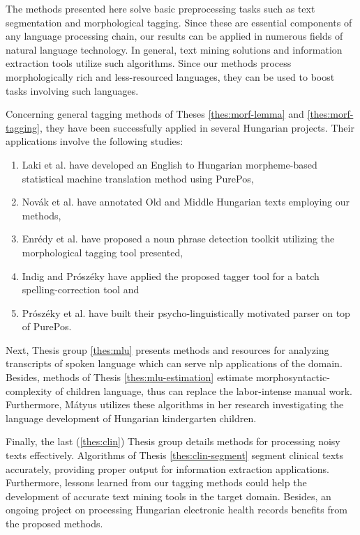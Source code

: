 
The methods presented here solve basic preprocessing tasks such as text segmentation and morphological tagging. 
Since these are essential components of any language processing chain, our results can be applied in numerous fields of natural language technology. 
In general, text mining solutions and information extraction tools utilize such algorithms.
Since our methods process morphologically rich and less-resourced languages, they can be used to boost tasks involving such languages.

Concerning general tagging methods of Theses \ref{thes:morf-lemma} and \ref{thes:morf-tagging}, they have been successfully applied in several Hungarian projects.
Their applications involve the following studies:
\begin{enumerate}
\item Laki et al. \cite{Laki2013} have developed an English to Hungarian morpheme-based statistical machine translation method using PurePos,
\item Novák et al. \cite{Novak2013} have annotated Old and Middle Hungarian texts employing our methods,
\item Enrédy et al. \cite{Endredy2014} have proposed a noun phrase detection toolkit utilizing the morphological tagging tool presented,
\item Indig and Prószéky have applied \cite{Indig2013} the proposed tagger tool for a batch spelling-correction tool and
\item Prószéky et al. \cite{Proszeky2014} have built their psycho-linguistically motivated parser on top of PurePos.
\end{enumerate}

Next, Thesis group \ref{thes:mlu} presents methods and resources for analyzing transcripts of spoken language which can serve \acrshort{nlp} applications of the domain.
Besides, methods of Thesis \ref{thes:mlu-estimation} estimate morphosyntactic-complexity of children language, thus can replace the labor-intense manual work.
Furthermore, Mátyus utilizes \cite{Matyus2014b} these algorithms in her research investigating the language development of Hungarian kindergarten children.

Finally, the last (\ref{thes:clin}) Thesis group details methods for processing noisy texts effectively.
Algorithms of Thesis \ref{thes:clin-segment} segment clinical texts accurately, providing proper output for information extraction applications. 
Furthermore, lessons learned from our tagging methods could help the development of accurate text mining tools in the target domain.
Besides, an ongoing project \cite{Siklosi2014,Siklosi2014mszny,Orosz2014x} on processing Hungarian electronic health records benefits from the proposed methods.



